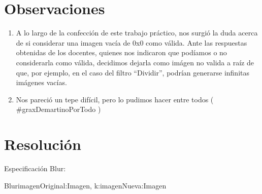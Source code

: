 \documentclass[10pt,a4paper,spanish]{article}
\begin{document}


\maketitle

\newpage


\clearpage

% 

\section{Observaciones}

	\begin{enumerate}
		\item A lo largo de la confección de este trabajo práctico, nos surgió la duda acerca de si considerar una imagen vacía de 0x0 como válida. Ante las respuestas obtenidas de los docentes, quienes nos indicaron que podíamos o no considerarla como válida, decidimos dejarla como imágen no valida a raíz de que, por ejemplo, en el caso del filtro ``Dividir'', podrían generarse infinitas imágenes vacías.
		\item Nos pareció un tepe difícil, pero lo pudimos hacer entre todos ( \#graxDemartinoPorTodo )
	\end{enumerate}


\section{Resolución}

\begin{ejercicio}
	Especificación Blur:

	\begin{problema}{Blur}{imagenOriginal:Imagen, k:\ent}{imagenNueva:Imagen}
	\end{problema}

\end{ejercicio}
\end{document}
